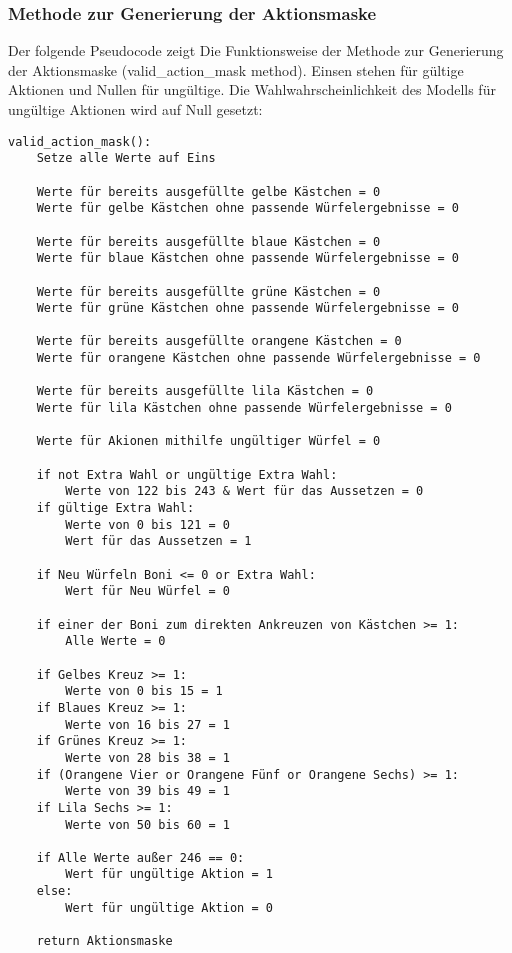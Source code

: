 \subsubsection{Methode zur Generierung der Aktionsmaske}
Der folgende Pseudocode zeigt Die Funktionsweise der Methode zur Generierung der Aktionsmaske (valid\_action\_mask method). Einsen stehen für gültige Aktionen und Nullen für ungültige. Die Wahlwahrscheinlichkeit des Modells für ungültige Aktionen wird auf Null gesetzt:
\vspace{0.5cm}
\begin{lstlisting}[caption={Methode zur Generierung der Aktionsmaske}]
valid_action_mask():
	Setze alle Werte auf Eins
	
	Werte für bereits ausgefüllte gelbe Kästchen = 0
	Werte für gelbe Kästchen ohne passende Würfelergebnisse = 0
	
	Werte für bereits ausgefüllte blaue Kästchen = 0
	Werte für blaue Kästchen ohne passende Würfelergebnisse = 0
	
	Werte für bereits ausgefüllte grüne Kästchen = 0
	Werte für grüne Kästchen ohne passende Würfelergebnisse = 0
	
	Werte für bereits ausgefüllte orangene Kästchen = 0
	Werte für orangene Kästchen ohne passende Würfelergebnisse = 0
	
	Werte für bereits ausgefüllte lila Kästchen = 0
	Werte für lila Kästchen ohne passende Würfelergebnisse = 0
	
	Werte für Akionen mithilfe ungültiger Würfel = 0
	
	if not Extra Wahl or ungültige Extra Wahl:
		Werte von 122 bis 243 & Wert für das Aussetzen = 0
	if gültige Extra Wahl:
		Werte von 0 bis 121 = 0
		Wert für das Aussetzen = 1
	
	if Neu Würfeln Boni <= 0 or Extra Wahl:
		Wert für Neu Würfel = 0
	
	if einer der Boni zum direkten Ankreuzen von Kästchen >= 1:
		Alle Werte = 0
	
	if Gelbes Kreuz >= 1:
		Werte von 0 bis 15 = 1
	if Blaues Kreuz >= 1:
		Werte von 16 bis 27 = 1
	if Grünes Kreuz >= 1:
		Werte von 28 bis 38 = 1
	if (Orangene Vier or Orangene Fünf or Orangene Sechs) >= 1:
		Werte von 39 bis 49 = 1
	if Lila Sechs >= 1:
		Werte von 50 bis 60 = 1
	
	if Alle Werte außer 246 == 0:
		Wert für ungültige Aktion = 1
	else:
		Wert für ungültige Aktion = 0
		
	return Aktionsmaske
\end{lstlisting}
